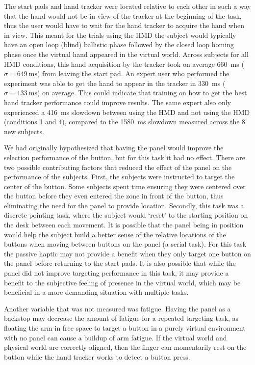 The start pads and hand tracker were located relative to each other in such a way that the hand would not be in view of the tracker at the beginning of the task, thus the user would have to wait for the hand tracker to acquire the hand when in view.
This meant for the trials using the HMD the subject would typically have an open loop (blind) ballistic phase followed by the closed loop homing phase once the virtual hand appeared in the virtual world.
Across subjects for all HMD conditions, this hand acquisition by the tracker took on average \SI{660}{\milli\second} ($\sigma = \SI{649}{\milli\second}$) from leaving the start pad.
An expert user who performed the experiment was able to get the hand to appear in the tracker in \SI{330}{\milli\second} ($\sigma = \SI{133}{\milli\second}$) on average.
This could indicate that training on how to get the best hand tracker performance could improve results.
The same expert also only experienced a \SI{416}{\milli\second} slowdown between using the HMD and not using the HMD (conditions 1 and 4), compared to the \SI{1580}{\milli\second} slowdown measured across the 8 new subjects.

We had originally hypothesized that having the panel would improve the selection performance of the button, but for this task it had no effect.
There are two possible contributing factors that reduced the effect of the panel on the performance of the subjects.
First, the subjects were instructed to target the center of the button.
Some subjects spent time ensuring they were centered over the button before they even entered the zone in front of the button, thus eliminating the need for the panel to provide location.
Secondly, this task was a discrete pointing task, where the subject would `reset' to the starting position on the desk between each movement.
It is possible that the panel being in position would help the subject build a better sense of the relative locations of the buttons when moving between buttons on the panel (a serial task).
For this task the passive haptic may not provide a benefit when they only target one button on the panel before returning to the start pads.
It is also possible that while the panel did not improve targeting performance in this task, it may provide a benefit to the subjective feeling of presence in the virtual world, which may be beneficial in a more demanding situation with multiple tasks.

Another variable that was not measured was fatigue.
Having the panel as a backstop may decrease the amount of fatigue for a repeated targeting task, as floating the arm in free space to target a button in a purely virtual environment with no panel can cause a buildup of arm fatigue.
If the virtual world and physical world are correctly aligned, then the finger can momentarily rest on the button while the hand tracker works to detect a button press.

